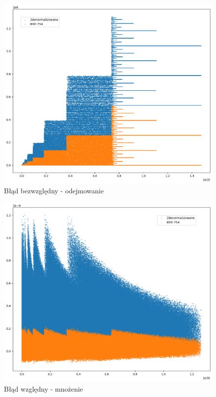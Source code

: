 \documentclass{article}
\begin{document}
\begin{figure}[H]
	\centering
	\includegraphics[height=0.4\textheight]{figures/sub_ulp.png}
	\caption{Błąd bezwzględny - odejmowanie}
	\label{fig:sub_ulp}
\end{figure}


\begin{figure}[H]
	\centering
	\includegraphics[height=0.4\textheight]{figures/mul_relative.png}
	\caption{Błąd względny - mnożenie}
	\label{fig:mul_relative}
\end{figure}
\end{document}
